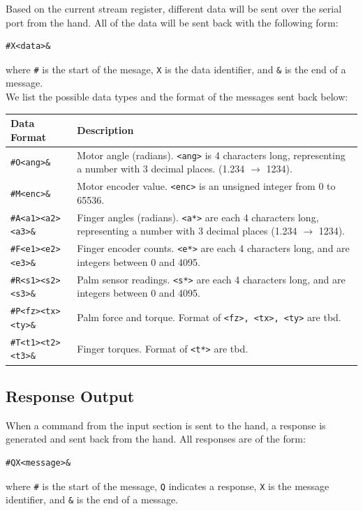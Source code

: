 \documentclass[letterpaper,notitlepage,10pt]{article}
\begin{document}
\noindent Based on the current stream register, different data will be sent over the serial port from the hand. All of the data will be sent back with the following form:
\begin{verbatim}
#X<data>&
\end{verbatim}
where \verb;#; is the start of the mesage, \verb;X; is the data identifier, and \verb;&; is the end of a message. \\

\noindent We list the possible data types and the format of the messages sent back below:\\

\begin{tabular}{l|p{}}
Data Format & Description \\
\hline
\verb;#O<ang>&; & Motor angle (radians). \verb;<ang>; is 4 characters long, representing a number with 3 decimal places. (1.234 $\rightarrow$ 1234). \\
\verb;#M<enc>&; & Motor encoder value. \verb;<enc>; is an unsigned integer from 0 to 65536. \\
\verb;#A<a1><a2><a3>&; & Finger angles (radians). \verb;<a*>; are each 4 characters long, representing a number with 3 decimal places (1.234 $\rightarrow$ 1234). \\
\verb;#F<e1><e2><e3>&; & Finger encoder counts. \verb;<e*>; are each 4 characters long, and are integers between 0 and 4095. \\
\verb;#R<s1><s2><s3>&; & Palm sensor readings. \verb;<s*>; are each 4 characters long, and are integers between 0 and 4095. \\
\verb;#P<fz><tx><ty>&; & Palm force and torque. Format of \verb;<fz>, <tx>, <ty>; are tbd. \\
\verb;#T<t1><t2><t3>&; & Finger torques. Format of \verb;<t*>; are tbd. \\

\end{tabular}


\subsection{Response Output}
When a command from the input section is sent to the hand, a response is generated and sent back from the hand. All responses are of the form:
\begin{verbatim}
#QX<message>&
\end{verbatim}
where \verb;#; is the start of the message, \verb;Q; indicates a response, \verb;X; is the message identifier, and \verb;&; is the end of a message. \\
\end{document}
